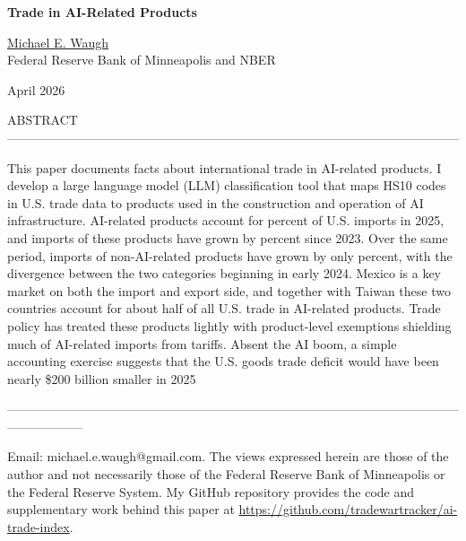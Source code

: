 \documentclass[12pt,pdftex]{article}
\begin{document}
\begin{onehalfspacing}

{\large \textbf{Trade in AI-Related Products}}

\vspace{0.5cm}

\href{http://www.waugheconomics.com/}{Michael E. Waugh} \\ Federal Reserve Bank of Minneapolis and NBER

\vspace{0.5cm}

April 2026

\vspace{2.25cm}


\normalsize

ABSTRACT ------------------------------------------------------------------------------------------------------------

This paper documents facts about international trade in AI-related products. I develop a large language model (LLM) classification tool that maps HS10 codes in U.S. trade data to products used in the construction and operation of AI infrastructure. AI-related products account for \aiShareTwentyFive{} percent of U.S. imports in 2025, and imports of these products have grown by \highAiPctChange{} percent since 2023. Over the same period, imports of non-AI-related products have grown by only \lowAiPctChange{} percent, with the divergence between the two categories beginning in early 2024. Mexico is a key market on both the import and export side, and together with Taiwan these two countries account for about half of all U.S. trade in AI-related products. Trade policy has treated these products lightly with product-level exemptions shielding much of AI-related imports from tariffs. Absent the AI boom, a simple accounting exercise suggests that the U.S. goods trade deficit would have been nearly \$200 billion smaller in 2025 

------------------------------------------------------------------------------------------------------------------------------
\vspace{0.25cm}




\vspace{4.25cm}

{\footnotesize Email: michael.e.waugh@gmail.com. The views expressed herein are those of the author and not necessarily those of the Federal Reserve Bank of Minneapolis or the Federal Reserve System. My GitHub repository provides the code and supplementary work behind this paper at \url{https://github.com/tradewartracker/ai-trade-index}.}


\end{onehalfspacing}
\end{document}
